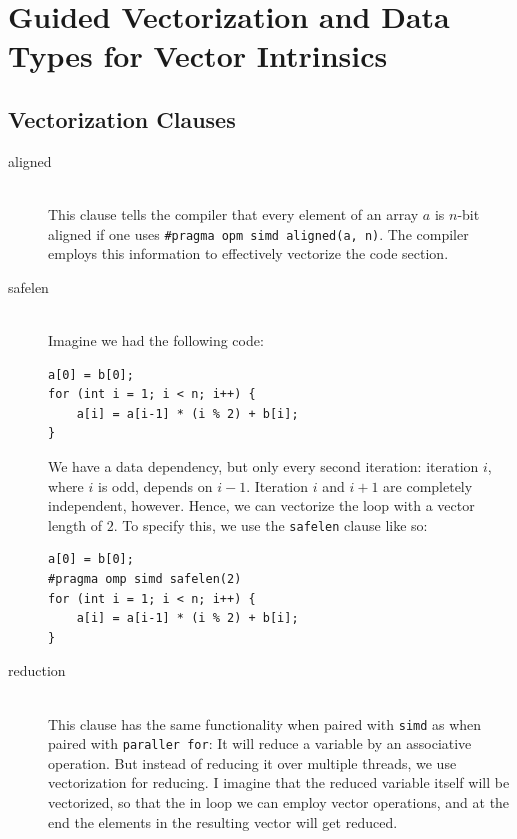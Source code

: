 \documentclass[../../main.tex]{subfiles}
\begin{document}
\newcommand{\drawcells}[3]{%
    \begin{tikzpicture}
        \foreach \j in {1,...,#1} {
            \node[draw, fill=#3!20, minimum width = \linewidth/#1, minimum height=0.5cm, align=center] (cell\j) at (\j*\linewidth/#1, 0) {#2};
        }
    \end{tikzpicture}}
\section{Guided Vectorization and Data Types for Vector Intrinsics}
\subsection{Vectorization Clauses}
\begin{description}
    \item[aligned] ~\\ This clause tells the compiler that every element of an array $a$ is $n$-bit aligned if one uses \texttt{\#pragma opm simd aligned(a, n)}. The compiler employs this information to effectively vectorize the code section.
    \bigskip
    \item[safelen] ~\\ Imagine we had the following code:
    \begin{lstlisting}
a[0] = b[0];
for (int i = 1; i < n; i++) {
    a[i] = a[i-1] * (i % 2) + b[i];
}
    \end{lstlisting}
    We have a data dependency, but only every second iteration: iteration $i$, where $i$ is odd, depends on $i-1$. Iteration $i$ and $i+1$ are completely independent, however. Hence, we can vectorize the loop with a vector length of $2$. To specify this, we use the \texttt{safelen} clause like so:
    \begin{lstlisting}
a[0] = b[0];
#pragma omp simd safelen(2)
for (int i = 1; i < n; i++) {
    a[i] = a[i-1] * (i % 2) + b[i];
}
    \end{lstlisting}   
    \bigskip
    \item[reduction] ~\\ This clause has the same functionality when paired with \texttt{simd} as when paired with \texttt{paraller for}: It will reduce a variable by an associative operation. But instead of reducing it over multiple threads, we use vectorization for reducing. I imagine that the reduced variable itself will be vectorized, so that the in loop we can employ vector operations, and at the end the elements in the resulting vector will get reduced.
\end{description}
\end{document}
